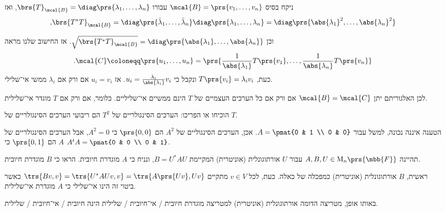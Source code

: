\documentclass[a4paper,10pt,twoside,openany]{book}
\renewcommand{\Mat}{\mathrm{M}}
\begin{document}
\begin{solution}
ניקח בסיס
$\mcal{B} = \prs{v_1, \ldots, v_n}$
עבורו
$\brs{T}_\mcal{B} = \diag\prs{\lambda_1, \ldots, \lambda_n}$,
ואז
\[\text{,} \brs{T^* T}_\mcal{B} = \diag\prs{\bar{\lambda}_1, \ldots, \bar{\lambda}_n} \diag\prs{\lambda_1, \ldots, \lambda_n} = \diag\prs{\abs{\lambda_1}^2, \ldots, \abs{\lambda_n}^2}\]
\end{solution}
וכן
$\sqrt{\brs{T^* T}_\mcal{B}} = \diag\prs{\abs{\lambda_1}, \ldots, \abs{\lambda_n}}$.
אז החישוב שלנו מראה
\begin{align*}
\text{.} \mcal{C} \coloneqq \prs{u_1, \ldots, u_n} = \prs{\frac{1}{\abs{\lambda_1}} T\prs{v_1}, \ldots, \frac{1}{\abs{\lambda_n}} T\prs{v_n}}
\end{align*}
כעת,
$T\prs{v_i} = \lambda_i v_i$
ונקבל כי
$u_i = \frac{\lambda_i}{\abs{\lambda_i}} v_i$.
אז
$u_i = v_i$
אם ורק אם
$\lambda_i$
ממשי אי־שלילי.

לכן האלגוריתם יתן
$\mcal{B} = \mcal{C}$
אם ורק אם כל הערכים העצמיים של
$T$
הינם ממשיים אי־שליליים. כלומר, אם ורק אם
$T$
מוגדר אי־שלילית.

\begin{exercisechap}
הוכיחו או הפריכו: הערכים הסינגולריים של
$T^2$
הם ריבועי הערכים הסינגולריים של
$T$.
\end{exercisechap}

\begin{solution}
הטענה איננה נכונה, למשל עבור
$A = \pmat{0 & 1 \\ 0 & 0}$.
אכן, הערכים הסינגוליים של
$A^2$
הם
$\prs{0,0}$
כי
$A^2 = 0$,
אבל הערכים הסינגולריים של
$A$
הם
$\prs{0,1}$
כי
$A^t A = \pmat{0 & 0 \\ 0 & 1}$.
\end{solution}

\begin{exercisechap}
תהיינה
$A,B,U \in \Mat_n\prs{\mbb{F}}$
עבור
$U$
אורתוגונלית (אוניטרית) המקיימת
$B = U^* A U$,
ונניח כי
$A$
מוגדרת חיובית.
הראו כי
$B$
מוגדרת חיובית.
\end{exercisechap}

\begin{solution}
ראשית,
$B$
אורתוגונלית (אוניטרית) כמפכלה של כאלה.
כעת, לכל
$v \in V$
מתקיים
$\trs{Bv, v} = \trs{U^* A U v, v} = \trs{A \prs{U v}, U v}$
כאשר ביטוי זה הינו אי־שלילי כי
$A$
מוגדרת אי־שלילית.
\end{solution}

\begin{remark}
באותו אופן, מטריצה הדומה אורתוגונלית (אוניטרית) למטריצה מוגדרת
חיובית%
\slash%
אי־חיובית%
\slash%
שלילית הינה
חיובית%
\slash%
אי־חיובית%
\slash%
שלילית.
\end{remark}
\end{document}
